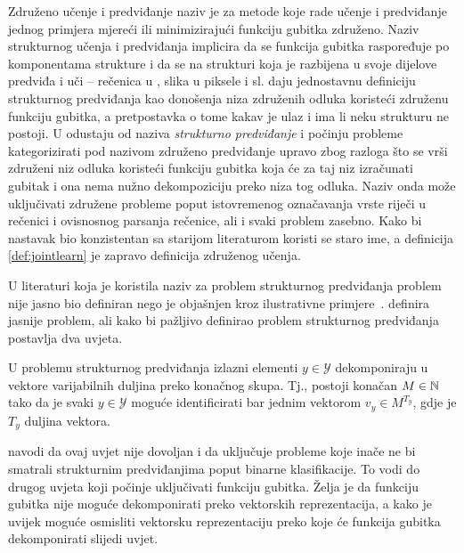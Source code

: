 Združeno učenje i predviđanje  naziv je za
metode koje rade učenje i predviđanje jednog primjera mjereći ili minimizirajući
funkciju gubitka združeno. Naziv strukturnog učenja i predviđanja
 implicira da se funkcija gubitka
raspoređuje po komponentama strukture i da se na strukturi koja je razbijena u
svoje dijelove predviđa i uči -- rečenica u , slika u piksele
i sl. \citet{daume14lts} daju jednostavnu definiciju strukturnog predviđanja kao
donošenja niza združenih odluka koristeći združenu funkciju gubitka, a
pretpostavka o tome kakav je ulaz i ima li neku strukturu ne postoji. U
\citep{daume15naacltalk} odustaju od naziva \emph{strukturno predviđanje} i
počinju probleme kategorizirati pod nazivom združeno predviđanje upravo zbog
razloga što se vrši združeni niz odluka koristeći funkciju gubitka koja će za
taj niz izračunati gubitak i ona nema nužno dekompoziciju preko niza tog odluka.
Naziv onda može uključivati združene probleme poput istovremenog označavanja
vrste riječi u rečenici i ovisnosnog parsanja rečenice, ali i svaki problem
zasebno. Kako bi nastavak bio konzistentan sa starijom literaturom koristi se
staro ime, a definicija \ref{def:jointlearn} je zapravo definicija združenog
učenja.

U literaturi koja je koristila naziv za problem strukturnog predviđanja problem
nije jasno bio definiran nego je objašnjen kroz ilustrativne
primjere~\citep{mccallum2000maximum, punyakanok2001use, lafferty2001conditional,
collins2002discriminative, taskar2003maximum, mcallester2004case,
tsochantaridis2005large}. \citet{daume06thesis} definira jasnije problem, ali
kako bi pažljivo definirao problem strukturnog predviđanja postavlja dva uvjeta.

\begin{condition} \label{uvjet1}

  U problemu strukturnog predviđanja izlazni elementi $y \in \mathcal{Y}$
  dekomponiraju u vektore varijabilnih duljina preko konačnog skupa. Tj.,
  postoji konačan $M \in \mathbb{N}$ tako da je svaki $y \in \mathcal{Y}$ moguće
  identificirati bar jednim vektorom $v_y \in M^{T_y}$, gdje je $T_y$ duljina
  vektora.

\end{condition}

\citeauthor{daume06thesis} navodi da ovaj uvjet nije dovoljan i da uključuje
probleme koje inače ne bi smatrali strukturnim predviđanjima poput binarne
klasifikacije. To vodi do drugog uvjeta koji počinje uključivati funkciju
gubitka. Želja je da funkciju gubitka nije moguće dekomponirati preko vektorskih
reprezentacija, a kako je uvijek moguće osmisliti vektorsku reprezentaciju preko
koje će funkcija gubitka dekomponirati slijedi uvjet.

